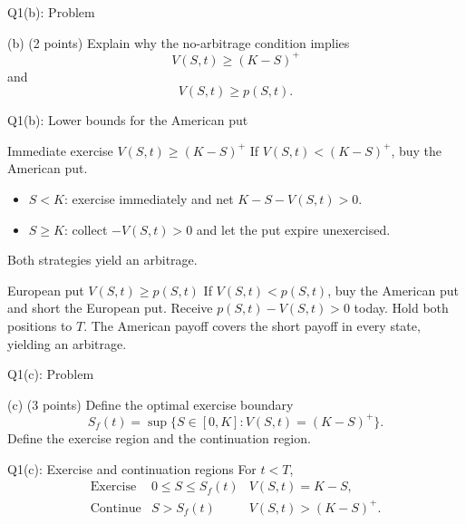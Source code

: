 \documentclass{beamer}
\begin{document}
\begin{frame}{Q1(b): Problem}
\footnotesize
\setlength{\abovedisplayskip}{5pt}
\setlength{\belowdisplayskip}{5pt}
\begin{block}{(b) \hfill (2 points)}
Explain why the no-arbitrage condition implies
\[
V(S,t)\geq(K-S)^+
\]
and
\[
V(S,t)\geq p(S,t).
\]
\end{block}
\end{frame}

\begin{frame}{Q1(b): Lower bounds for the American put}
\small
\begin{block}{Immediate exercise \quad $V(S,t)\geq (K-S)^+$}
If $V(S,t)<(K-S)^+$, buy the American put.
\begin{itemize}
\item $S<K$: exercise immediately and net $K-S-V(S,t)>0$.
\item $S\geq K$: collect $-V(S,t)>0$ and let the put expire unexercised.
\end{itemize}
Both strategies yield an arbitrage.
\end{block}

\begin{block}{European put \quad $V(S,t)\geq p(S,t)$}
If $V(S,t)<p(S,t)$, buy the American put and short the European put.
Receive $p(S,t)-V(S,t)>0$ today. Hold both positions to $T$.
The American payoff covers the short payoff in every state, yielding an arbitrage.
\end{block}
\end{frame}

\begin{frame}{Q1(c): Problem}
\footnotesize
\setlength{\abovedisplayskip}{5pt}
\setlength{\belowdisplayskip}{5pt}
\begin{block}{(c) \hfill (3 points)}
Define the optimal exercise boundary
\[
S_f(t)=\sup\{S\in[0,K]:V(S,t)=(K-S)^+\}.
\]
Define the exercise region and the continuation region.
\end{block}
\end{frame}

\begin{frame}{Q1(c): Exercise and continuation regions}
\small
For $t<T$,
\[
\begin{array}{lll}
\text{Exercise} & 0\leq S\leq S_f(t) & V(S,t)=K-S,\\
\text{Continue} & S>S_f(t) & V(S,t)>(K-S)^+.
\end{array}
\]
\end{frame}
\end{document}
